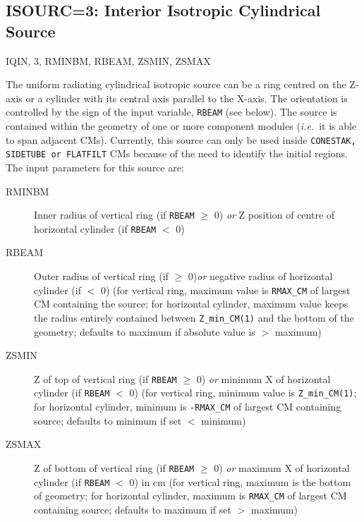 \documentclass[12pt,twoside]{article}
\newcommand{\cen}[1]{\begin{center} #1 \end{center}                   }
\newcommand{\ie}{{\em i.e.}}
\begin{document}
\subsection{ISOURC=3: Interior Isotropic Cylindrical Source}
\label{isourc3sect}
\cen{IQIN, 3, RMINBM, RBEAM, ZSMIN, ZSMAX}
The uniform radiating cylindrical isotropic source can be a ring
centred on the Z-axis or a cylinder with its central axis parallel to
the X-axis.  The orientation is controlled by the sign of the input variable,
\verb+RBEAM+ (see below).  The source is contained within the geometry
of one or more component modules (\ie\ it is able to span adjacent CMs).
Currently, this source can only be used inside
\verb+CONESTAK, SIDETUBE or FLATFILT+ CMs because of the need to
identify the initial regions.
The input parameters for this source are:
\begin{description}
\item [RMINBM] Inner radius of vertical ring (if \verb+RBEAM+ $\geq$ 0){\it
or} Z position of centre of horizontal cylinder (if \verb+RBEAM+ $<$ 0)
\item [RBEAM] Outer radius of vertical ring (if $\geq$ 0){\it or} negative
radius of horizontal cylinder (if $<$ 0) (for vertical ring,
maximum value is \verb+RMAX_CM+ of largest CM containing the source;
for horizontal cylinder, maximum value
keeps the radius entirely contained between \verb+Z_min_CM(1)+ and the
bottom of the geometry; defaults to maximum if absolute value is $>$ maximum)
\item [ZSMIN] Z of top of vertical ring (if \verb+RBEAM+ $\geq$ 0){\it
or} minimum X
of horizontal cylinder (if \verb+RBEAM+ $<$ 0) (for vertical ring, minimum
value is \verb+Z_min_CM(1)+; for horizontal cylinder, minimum is
\verb+-RMAX_CM+ of largest CM containing source; defaults to minimum if set $<$
minimum) \item [ZSMAX] Z of bottom of vertical ring (if \verb+RBEAM+ $\geq$ 0)
{\it or} maximum X of horizontal cylinder (if \verb+RBEAM+ $<$ 0) in cm (for vertical
ring, maximum is the bottom of geometry; for horizontal cylinder, maximum is
\verb+RMAX_CM+ of largest CM containing source; defaults to maximum if set $>$
maximum)
\end{description}
\end{document}
